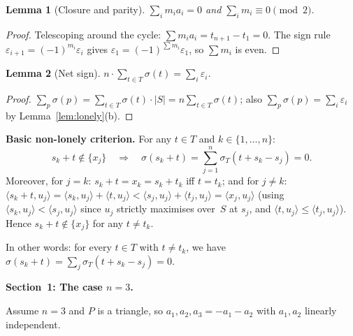 \documentclass{article}
\newtheorem{lemma}{Lemma}
\begin{document}
\begin{lemma}[Closure and parity]\label{lem:closure}
$\sum_{i}m_i a_i=0$ and $\sum_i m_i\equiv 0\pmod{2}$.
\end{lemma}
\begin{proof}
Telescoping around the cycle: $\sum m_i a_i=t_{n+1}-t_1=0$.
The sign rule $\varepsilon_{i+1}=(-1)^{m_i}\varepsilon_i$ gives $\varepsilon_1=(-1)^{\sum m_i}\varepsilon_1$,
so $\sum m_i$ is even.
\end{proof}

\begin{lemma}[Net sign]\label{lem:netsign}
$n\cdot\sum_{t\in T}\sigma(t)=\sum_i\varepsilon_i$.
\end{lemma}
\begin{proof}
$\sum_p\sigma(p)
 =\sum_{t\in T}\sigma(t)\cdot|S|
 =n\sum_{t\in T}\sigma(t)$;
also $\sum_p\sigma(p)=\sum_i\varepsilon_i$ by Lemma~\ref{lem:lonely}(b).
\end{proof}

\noindent\textbf{Basic non-lonely criterion.}
For any $t\in T$ and $k\in\{1,\dots,n\}$:
\begin{equation}\label{eq:nonlonely}
  s_k+t\notin\{x_j\}
  \quad\Longrightarrow\quad
  \sigma(s_k+t) = \sum_{j=1}^n\sigma_T(t+s_k-s_j) = 0.
\end{equation}
Moreover, for $j=k$: $s_k+t=x_k=s_k+t_k$ iff $t=t_k$; and for $j\ne k$:
$\langle s_k+t,u_j\rangle=\langle s_k,u_j\rangle+\langle t,u_j\rangle
 <\langle s_j,u_j\rangle+\langle t_j,u_j\rangle=\langle x_j,u_j\rangle$
(using $\langle s_k,u_j\rangle<\langle s_j,u_j\rangle$ since $u_j$ strictly maximises over~$S$
at $s_j$, and $\langle t,u_j\rangle\le\langle t_j,u_j\rangle$).
Hence $s_k+t\notin\{x_j\}$ for any $t\ne t_k$.

In other words: for every $t\in T$ with $t\ne t_k$, we have
$\sigma(s_k+t)=\sum_j\sigma_T(t+s_k-s_j)=0$.

\bigskip
\noindent\textbf{Section~1: The case $n=3$.}

Assume $n=3$ and $P$ is a triangle, so $a_1,a_2,a_3=-a_1-a_2$ with $a_1,a_2$ linearly
independent.
\end{document}
